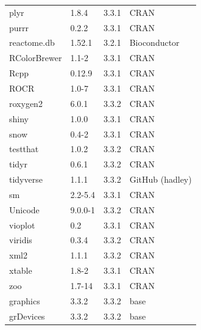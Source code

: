 \begin{figure}[!htp]
\begin{longtable}{llll}
\rowcolor{black!5}
plyr         & 1.8.4          & 3.3.1 & CRAN            \\
\rowcolor{black!10}
purrr        & 0.2.2          & 3.3.1 & CRAN            \\
\rowcolor{black!5}
reactome.db  & 1.52.1         & 3.2.1 & Bioconductor    \\
\rowcolor{black!10}
RColorBrewer & 1.1-2          & 3.3.1 & CRAN            \\
\rowcolor{black!5}
Rcpp         & 0.12.9         & 3.3.1 & CRAN            \\
\rowcolor{black!10}
ROCR         & 1.0-7          & 3.3.1 & CRAN            \\
\rowcolor{black!5}
roxygen2     & 6.0.1          & 3.3.2 & CRAN            \\
\rowcolor{black!10}
shiny        & 1.0.0          & 3.3.1 & CRAN            \\
\rowcolor{black!5}
snow         & 0.4-2          & 3.3.1 & CRAN            \\
\rowcolor{black!10}
testthat     & 1.0.2          & 3.3.2 & CRAN            \\
\rowcolor{black!5}
tidyr        & 0.6.1          & 3.3.2 & CRAN            \\
\rowcolor{black!10}
tidyverse    & 1.1.1          & 3.3.2 & GitHub (hadley) \\
\rowcolor{black!5}
sm           & 2.2-5.4        & 3.3.1 & CRAN            \\
\rowcolor{black!10}
Unicode      & 9.0.0-1        & 3.3.2 & CRAN            \\
\rowcolor{black!5}
vioplot      & 0.2            & 3.3.1 & CRAN            \\
\rowcolor{black!10}
viridis      & 0.3.4          & 3.3.2 & CRAN            \\
\rowcolor{black!5}
xml2         & 1.1.1          & 3.3.2 & CRAN            \\
\rowcolor{black!10}
xtable       & 1.8-2          & 3.3.1 & CRAN            \\
\rowcolor{black!5}
zoo          & 1.7-14         & 3.3.1 & CRAN            \\
\rowcolor{black!10}
graphics     & 3.3.2          & 3.3.2 & base            \\
\rowcolor{black!5}
grDevices    & 3.3.2          & 3.3.2 & base            \\

\end{longtable}
\end{figure}
